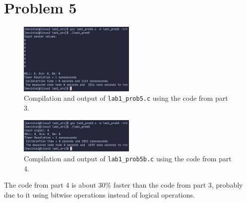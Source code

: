 \documentclass{article}
\begin{document}
\section{Problem 5}

\begin{figure}[H]
    \centering
    \includegraphics[width=0.5\textwidth]{./images/prob5part1.png}
    \caption{Compilation and output of \lstinline!lab1_prob5.c! using the code from part 3.}
\end{figure}

\begin{figure}[H]
    \centering
    \includegraphics[width=0.5\textwidth]{./images/prob5part2.png}
    \caption{Compilation and output of \lstinline!lab1_prob5b.c! using the code from part 4.}
\end{figure}

The code from part 4 is about 30\% faster than the code from part 3, probably due to it using bitwise operations instead of logical operations.
\end{document}
